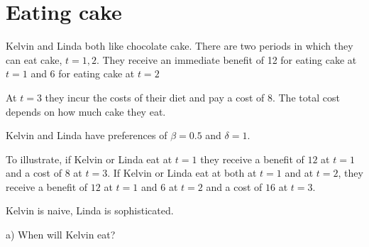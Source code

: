 \documentclass[
  letterpaper,
  DIV=11,
  numbers=noendperiod]{scrreprt}
\begin{document}
\hypertarget{eating-cake}{%
\section{Eating cake}\label{eating-cake}}

Kelvin and Linda both like chocolate cake. There are two periods in
which they can eat cake, \(t=1,2\). They receive an immediate benefit of
12 for eating cake at \(t=1\) and 6 for eating cake at \(t=2\)

At \(t=3\) they incur the costs of their diet and pay a cost of \(8\).
The total cost depends on how much cake they eat.

Kelvin and Linda have preferences of \(\beta=0.5\) and \(\delta=1\).

To illustrate, if Kelvin or Linda eat at \(t=1\) they receive a benefit
of \(12\) at \(t=1\) and a cost of \(8\) at \(t=3\). If Kelvin or Linda
eat at both at \(t=1\) and at \(t=2\), they receive a benefit of \(12\)
at \(t=1\) and \(6\) at \(t=2\) and a cost of \(16\) at \(t=3\).

Kelvin is naive, Linda is sophisticated.

a) When will Kelvin eat?
\end{document}
